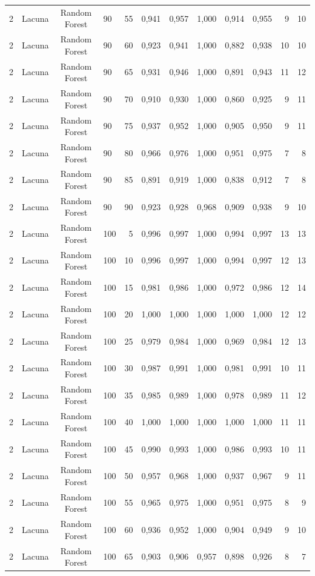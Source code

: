 \begin{longtable}{ccclrrrrrrrr}
2 & Lacuna & Random Forest & 90 & 55 & 0,941 & 0,957 & 1,000 & 0,914 & 0,955 & 9 & 10 \\
2 & Lacuna & Random Forest & 90 & 60 & 0,923 & 0,941 & 1,000 & 0,882 & 0,938 & 10 & 10 \\
2 & Lacuna & Random Forest & 90 & 65 & 0,931 & 0,946 & 1,000 & 0,891 & 0,943 & 11 & 12 \\
2 & Lacuna & Random Forest & 90 & 70 & 0,910 & 0,930 & 1,000 & 0,860 & 0,925 & 9 & 11 \\
2 & Lacuna & Random Forest & 90 & 75 & 0,937 & 0,952 & 1,000 & 0,905 & 0,950 & 9 & 11 \\
2 & Lacuna & Random Forest & 90 & 80 & 0,966 & 0,976 & 1,000 & 0,951 & 0,975 & 7 & 8 \\
2 & Lacuna & Random Forest & 90 & 85 & 0,891 & 0,919 & 1,000 & 0,838 & 0,912 & 7 & 8 \\
2 & Lacuna & Random Forest & 90 & 90 & 0,923 & 0,928 & 0,968 & 0,909 & 0,938 & 9 & 10 \\
2 & Lacuna & Random Forest & 100 & 5 & 0,996 & 0,997 & 1,000 & 0,994 & 0,997 & 13 & 13 \\
2 & Lacuna & Random Forest & 100 & 10 & 0,996 & 0,997 & 1,000 & 0,994 & 0,997 & 12 & 13 \\
2 & Lacuna & Random Forest & 100 & 15 & 0,981 & 0,986 & 1,000 & 0,972 & 0,986 & 12 & 14 \\
2 & Lacuna & Random Forest & 100 & 20 & 1,000 & 1,000 & 1,000 & 1,000 & 1,000 & 12 & 12 \\
2 & Lacuna & Random Forest & 100 & 25 & 0,979 & 0,984 & 1,000 & 0,969 & 0,984 & 12 & 13 \\
2 & Lacuna & Random Forest & 100 & 30 & 0,987 & 0,991 & 1,000 & 0,981 & 0,991 & 10 & 11 \\
2 & Lacuna & Random Forest & 100 & 35 & 0,985 & 0,989 & 1,000 & 0,978 & 0,989 & 11 & 12 \\
2 & Lacuna & Random Forest & 100 & 40 & 1,000 & 1,000 & 1,000 & 1,000 & 1,000 & 11 & 11 \\
2 & Lacuna & Random Forest & 100 & 45 & 0,990 & 0,993 & 1,000 & 0,986 & 0,993 & 10 & 11 \\
2 & Lacuna & Random Forest & 100 & 50 & 0,957 & 0,968 & 1,000 & 0,937 & 0,967 & 9 & 11 \\
2 & Lacuna & Random Forest & 100 & 55 & 0,965 & 0,975 & 1,000 & 0,951 & 0,975 & 8 & 9 \\
2 & Lacuna & Random Forest & 100 & 60 & 0,936 & 0,952 & 1,000 & 0,904 & 0,949 & 9 & 10 \\
2 & Lacuna & Random Forest & 100 & 65 & 0,903 & 0,906 & 0,957 & 0,898 & 0,926 & 8 & 7 \\

\end{longtable}
